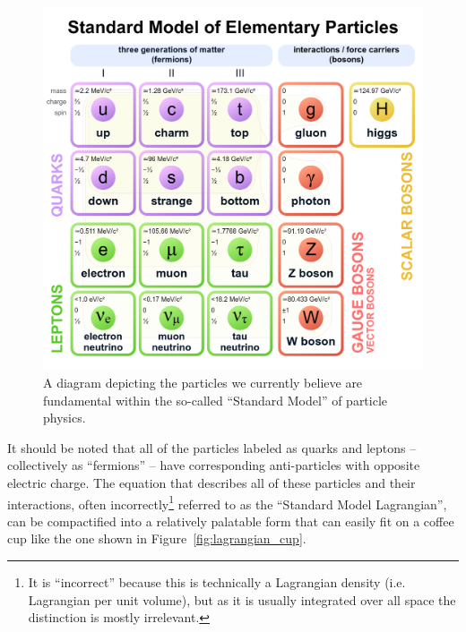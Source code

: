 \begin{figure}
    \centering
    \includegraphics[scale=0.2]{figures/introduction/StandardModel.png}
    \caption{A diagram depicting the particles we currently believe are fundamental within the so-called ``Standard Model'' of particle physics.}
    \label{fig:standard_model}
\end{figure}
 It should be noted that all of the particles labeled as quarks and leptons -- collectively as ``fermions'' -- have corresponding anti-particles with opposite electric charge.
The equation that describes all of these particles and their interactions, often incorrectly\footnote[1]{It is ``incorrect'' because this is technically a Lagrangian density (i.e. Lagrangian per unit volume), but as it is usually integrated over all space the distinction is mostly irrelevant.} referred to as the ``Standard Model Lagrangian'', can be compactified into a relatively palatable form that can easily fit on a coffee cup like the one shown in Figure~\ref{fig:lagrangian_cup}.
